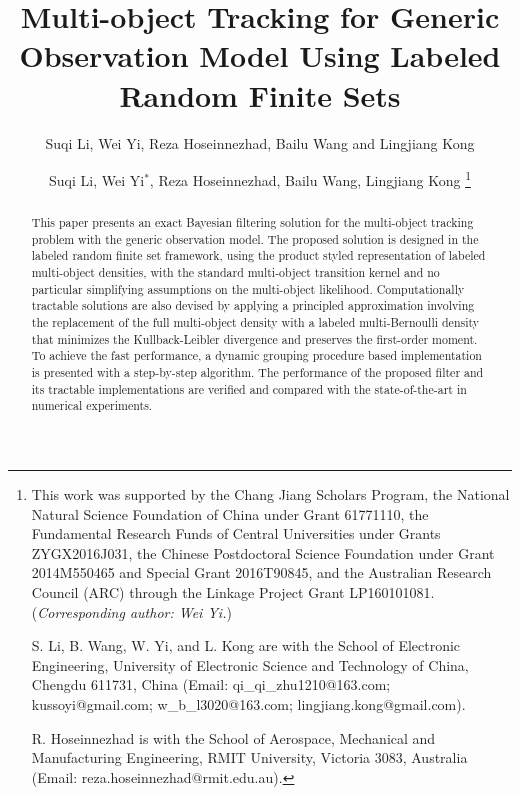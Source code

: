 \documentclass[journal]{IEEEtran}
\begin{document}
\title{Multi-object Tracking  for Generic Observation Model Using Labeled Random Finite Sets}
\author{
Suqi Li, Wei Yi, Reza Hoseinnezhad, Bailu Wang and Lingjiang Kong\\
}

\author{
Suqi Li, Wei Yi$^*$, Reza Hoseinnezhad, Bailu Wang, Lingjiang Kong
\thanks{This work was supported
by the Chang Jiang Scholars Program, the National Natural Science Foundation of China under Grant 61771110, the Fundamental Research Funds of Central Universities under Grants ZYGX2016J031, the Chinese Postdoctoral Science Foundation under Grant 2014M550465 and Special Grant 2016T90845,  and the Australian Research Council (ARC) through the Linkage Project Grant LP160101081. (\textit{Corresponding author: Wei Yi.})


S. Li, B. Wang, W. Yi,  and L. Kong  are with the School of  Electronic Engineering, University of Electronic Science and Technology of China, Chengdu 611731, China (Email: qi\_qi\_zhu1210@163.com;  kussoyi@gmail.com; w\_b\_l3020@163.com; lingjiang.kong@gmail.com).

R. Hoseinnezhad is with the School of Aerospace, Mechanical and Manufacturing Engineering, RMIT University, Victoria 3083, Australia (Email: reza.hoseinnezhad@rmit.edu.au). 



}
}


\maketitle

\begin{abstract}
This paper presents  an exact Bayesian filtering solution for the multi-object tracking problem with the generic observation model. The proposed solution is designed in the labeled random finite set framework, using the product styled representation of labeled multi-object densities, with the standard multi-object transition kernel and no particular simplifying assumptions on the multi-object likelihood. 
Computationally tractable solutions are also devised by applying a principled approximation involving the replacement of the full multi-object density with a labeled multi-Bernoulli density that minimizes the Kullback-Leibler divergence and preserves the first-order moment. To achieve the fast performance, a dynamic grouping procedure based implementation is presented with a step-by-step algorithm. The performance of the proposed filter and its tractable implementations are verified and compared with the state-of-the-art in numerical experiments.
\end{abstract}
\IEEEpeerreviewmaketitle
\end{document}
